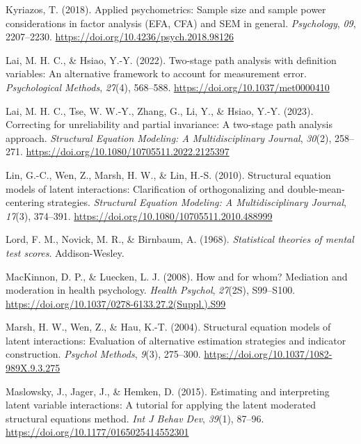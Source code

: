 \documentclass[
  man]{apa6}
\newlength{\cslhangindent}
\newenvironment{CSLReferences}[2] %
 {\begin{list}{}{%
  \setlength{\itemindent}{0pt}
  \setlength{\leftmargin}{0pt}
  \setlength{\parsep}{0pt}
  \ifodd #1
   \setlength{\leftmargin}{\cslhangindent}
   \setlength{\itemindent}{-1\cslhangindent}
  \fi
  \setlength{\itemsep}{#2\baselineskip}}}
 {\end{list}}
\begin{document}
\begin{CSLReferences}{1}{0}
Kyriazos, T. (2018). Applied psychometrics: {Sample} size and sample power considerations in factor analysis ({EFA}, {CFA}) and {SEM} in general. \emph{Psychology}, \emph{09}, 2207--2230. \url{https://doi.org/10.4236/psych.2018.98126}

Lai, M. H. C., \& Hsiao, Y.-Y. (2022). Two-stage path analysis with definition variables: {An} alternative framework to account for measurement error. \emph{Psychological Methods}, \emph{27}(4), 568--588. \url{https://doi.org/10.1037/met0000410}

Lai, M. H. C., Tse, W. W.-Y., Zhang, G., Li, Y., \& Hsiao, Y.-Y. (2023). Correcting for unreliability and partial invariance: {A} two-stage path analysis approach. \emph{Structural Equation Modeling: A Multidisciplinary Journal}, \emph{30}(2), 258--271. \url{https://doi.org/10.1080/10705511.2022.2125397}

Lin, G.-C., Wen, Z., Marsh, H. W., \& Lin, H.-S. (2010). Structural equation models of latent interactions: {Clarification} of orthogonalizing and double-mean-centering strategies. \emph{Structural Equation Modeling: A Multidisciplinary Journal}, \emph{17}(3), 374--391. \url{https://doi.org/10.1080/10705511.2010.488999}

Lord, F. M., Novick, M. R., \& Birnbaum, A. (1968). \emph{Statistical theories of mental test scores}. Addison-Wesley.

MacKinnon, D. P., \& Luecken, L. J. (2008). How and for whom? {Mediation} and moderation in health psychology. \emph{Health Psychol}, \emph{27}(2S), S99--S100. \url{https://doi.org/10.1037/0278-6133.27.2(Suppl.).S99}

Marsh, H. W., Wen, Z., \& Hau, K.-T. (2004). Structural equation models of latent interactions: Evaluation of alternative estimation strategies and indicator construction. \emph{Psychol Methods}, \emph{9}(3), 275--300. \url{https://doi.org/10.1037/1082-989X.9.3.275}

Maslowsky, J., Jager, J., \& Hemken, D. (2015). Estimating and interpreting latent variable interactions: {A} tutorial for applying the latent moderated structural equations method. \emph{Int J Behav Dev}, \emph{39}(1), 87--96. \url{https://doi.org/10.1177/0165025414552301}


\end{CSLReferences}
\end{document}
